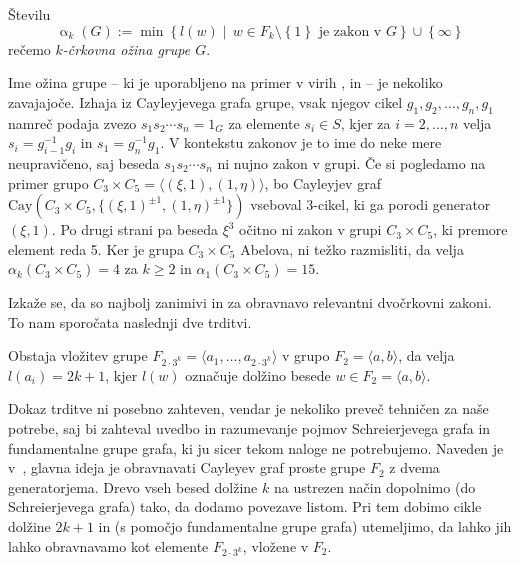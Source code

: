\begin{definicija}\label{def_ozina}
    Številu \begin{equation*}
    \operatorname{\alpha}_{k}(G) := \min \left\{ l(w)  \middle|\,  w \in F_k \setminus \left\{ 1\right\} \text{ je zakon v } G  \right\} \cup \left\{ \infty\right\} 
    \end{equation*}  
    rečemo \emph{$k$-črkovna ožina grupe $G$}.  
    \end{definicija}
    

\begin{opomba} %
Ime ožina grupe -- ki je uporabljeno na primer v virih \cite{Schneider_2016}, \cite{Bradford_Thom_2017} in \cite{Schleimer_2001} -- je nekoliko zavajajoče. Izhaja iz Cayleyjevega grafa grupe, vsak njegov cikel $g_1 , g_2, \ldots, g_n, g_1$ namreč
podaja zvezo $s_1 s_2 \cdots s_n = 1_G$ za elemente $s_i \in S$, kjer za $i = 2, \ldots, n$ velja $s_i = g_{i - 1}^{-1} g_i$ in $s_1 = g_n^{-1} g_1$.
V kontekstu zakonov je to ime do neke mere neupravičeno, saj beseda $s_1 s_2 \cdots s_n$ ni nujno zakon v grupi. Če si pogledamo na primer grupo $C_3 \times C_5 = \langle (\xi, 1), (1, \eta) \rangle$,
bo Cayleyjev graf $\text{Cay}(C_3 \times C_5, \{ (\xi, 1)^{\pm 1} , (1, \eta)^{\pm 1} \})$ vseboval 3-cikel, ki ga porodi generator $(\xi , 1)$. Po drugi strani pa beseda $\xi^3$ očitno ni zakon v grupi $C_3 \times C_5$, ki premore element reda 5.
Ker je grupa $C_3 \times C_5$ Abelova, ni težko razmisliti, da velja $\alpha_k(C_3 \times C_5) = 4$ za $k \ge 2$ in $\alpha_1(C_3 \times C_5) = 15$. 

\end{opomba}

Izkaže se, da so najbolj zanimivi in za obravnavo relevantni dvočrkovni zakoni. To nam sporočata naslednji dve trditvi.
\begin{trditev}
\label{trd_vlozitev_proste_grupe}
 Obstaja vložitev grupe $F_{2 \cdot 3^{k}} = \langle a_1, \ldots, a_{2 \cdot 3^{k}} \rangle$ v grupo $F_2 = \langle a,b \rangle $, da velja $l(a_i) = 2k + 1$, kjer $l(w)$ označuje dolžino besede $w \in F_2 = \langle a,b \rangle$. 
\end{trditev}


\begin{dokaz}
Dokaz trditve ni posebno zahteven, vendar je nekoliko preveč tehničen za naše potrebe, saj bi zahteval uvedbo in razumevanje pojmov Schreierjevega grafa in fundamentalne grupe grafa, ki ju sicer tekom naloge ne potrebujemo. Naveden je v~\cite[str.~5]{Schneider_2016}, glavna ideja je obravnavati Cayleyev graf proste grupe $F_2$ z dvema generatorjema.
Drevo vseh besed dolžine $k$ na ustrezen način dopolnimo (do Schreierjevega grafa) tako, da dodamo povezave listom. Pri tem dobimo cikle dolžine $2k + 1$ in (s pomočjo fundamentalne grupe grafa) utemeljimo, da lahko jih lahko obravnavamo kot elemente $F_{2 \cdot 3^{k}}$, vložene v $F_2$. 
\end{dokaz}


